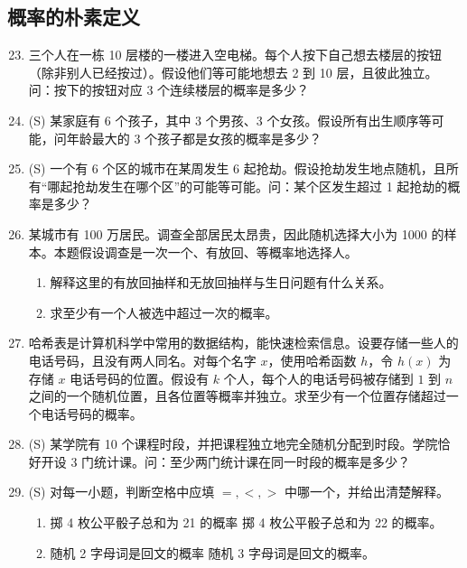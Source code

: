 \documentclass[UTF8,12pt,a4paper,fontset=fandol]{ctexart}
\begin{document}
\subsection*{概率的朴素定义}

\begin{enumerate}
  \setcounter{enumi}{22}
  \item 三个人在一栋 10 层楼的一楼进入空电梯。每个人按下自己想去楼层的按钮（除非别人已经按过）。假设他们等可能地想去 2 到 10 层，且彼此独立。问：按下的按钮对应 3 个连续楼层的概率是多少？

  \item (S) 某家庭有 6 个孩子，其中 3 个男孩、3 个女孩。假设所有出生顺序等可能，问年龄最大的 3 个孩子都是女孩的概率是多少？

  \item (S) 一个有 6 个区的城市在某周发生 6 起抢劫。假设抢劫发生地点随机，且所有“哪起抢劫发生在哪个区”的可能等可能。问：某个区发生超过 1 起抢劫的概率是多少？

  \item 某城市有 100 万居民。调查全部居民太昂贵，因此随机选择大小为 1000 的样本。本题假设调查是一次一个、有放回、等概率地选择人。
  \begin{enumerate}
    \item 解释这里的有放回抽样和无放回抽样与生日问题有什么关系。
    \item 求至少有一个人被选中超过一次的概率。
  \end{enumerate}

  \item 哈希表是计算机科学中常用的数据结构，能快速检索信息。设要存储一些人的电话号码，且没有两人同名。对每个名字 $x$，使用哈希函数 $h$，令 $h(x)$ 为存储 $x$ 电话号码的位置。假设有 $k$ 个人，每个人的电话号码被存储到 $1$ 到 $n$ 之间的一个随机位置，且各位置等概率并独立。求至少有一个位置存储超过一个电话号码的概率。

  \item (S) 某学院有 10 个课程时段，并把课程独立地完全随机分配到时段。学院恰好开设 3 门统计课。问：至少两门统计课在同一时段的概率是多少？

  \item (S) 对每一小题，判断空格中应填 $=,<,>$ 中哪一个，并给出清楚解释。
  \begin{enumerate}
    \item 掷 4 枚公平骰子总和为 21 的概率 \underline{\hspace{1cm}} 掷 4 枚公平骰子总和为 22 的概率。
    \item 随机 2 字母词是回文的概率 \underline{\hspace{1cm}} 随机 3 字母词是回文的概率。
  \end{enumerate}


\end{enumerate}
\end{document}
